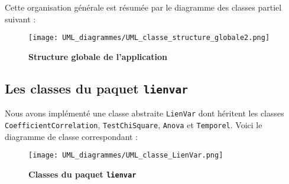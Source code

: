 \documentclass[11pt]{article}
\begin{document}
Cette organisation générale est résumée par le diagramme des classes partiel suivant :
\begin{figure}[H]
    \caption{\textbf{Structure globale de l'application}}
    \label{UML_classe_struct_glob}
    \centering
    \texttt{[image: UML\_diagrammes/UML\_classe\_structure\_globale2.png]}
\end{figure}


\subsection{Les classes du paquet \texttt{lienvar}}

Nous avons implémenté une classe abstraite \texttt{LienVar} dont héritent les classes \texttt{CoefficientCorrelation}, \texttt{TestChiSquare}, \texttt{Anova} et \texttt{Temporel}. Voici le diagramme de classe correspondant :

\begin{figure}[H]
    \caption{\textbf{Classes du paquet \texttt{lienvar}}}
    \label{UML_classe_lienvar}
    \centering
    \texttt{[image: UML\_diagrammes/UML\_classe\_LienVar.png]}
\end{figure}
\end{document}
